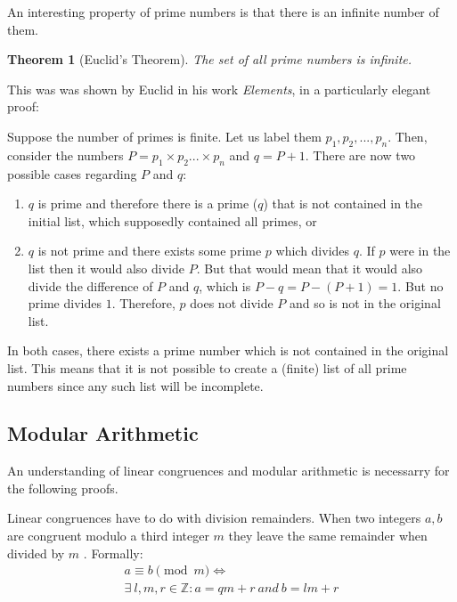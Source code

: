 \documentclass[12pt, titlepage]{article}
\newtheorem{theorem}{Theorem}
\begin{document}
    An interesting property of prime numbers is that there is an infinite number of them. 
    \begin{theorem}[Euclid's Theorem]
        The set of all prime numbers is infinite.
    \end{theorem}
%
    This was was shown by Euclid in his work \emph{Elements}, in a particularly elegant
    proof\autocite[19]{dence}:

    Suppose the number of primes is finite. Let us label them $p_1, p_2, ..., p_n$. Then,
    consider the numbers $P = p_1\times p_2 ... \times p_n$ and $q = P + 1$. There are now
    two possible cases regarding $P$ and $q$:
    \begin{enumerate}[label=\alph*)]
        \item $q$ is prime and therefore there is a prime ($q$) that is not contained in the
            initial list, which supposedly contained all primes, or
        \item $q$ is not prime and there exists some prime $p$ which divides $q$. If $p$
            were in the list then it would also divide $P$. But that would mean that it
            would also divide the difference of $P$ and $q$, which is $P - q = P - (P + 1) =
            1$. But no prime divides $1$.  Therefore, $p$ does not divide $P$ and so is not
            in the original list.
    \end{enumerate}
    In both cases, there exists a prime number which is not contained in the original list.
    This means that it is not possible to create a (finite) list of all prime numbers since
    any such list will be incomplete.
        

    \subsection{Modular Arithmetic}
    An understanding of linear congruences and modular arithmetic is necessarry for the
    following proofs.

    Linear congruences have to do with division remainders. When two integers $a, b$ are
    congruent modulo a third integer $m$ they leave the same remainder when divided by $m$
    \autocite[278]{haese_ib_options}. Formally:
    \begin{equation}\label{eq:congr_def_long}
        \begin{gathered}
            a \equiv b \pmod{m} \iff \\
            \exists\ l,m,r \in \mathbb{Z}: a = qm + r\ and\ b = lm + r
        \end{gathered}
    \end{equation}
\end{document}
